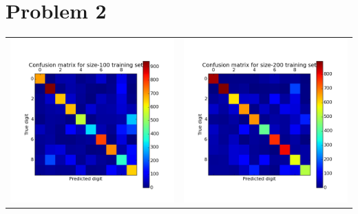 \documentclass[11pt]{article}
\begin{document}
\section*{Problem 2}
\begin{tabular}{cc}
\includegraphics[scale=0.5]{images/confusion_matrix_100} & \includegraphics[scale=0.5]{images/confusion_matrix_200} \\

\end{tabular}
\end{document}
